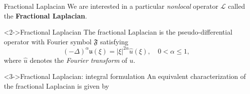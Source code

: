 \documentclass[aspectratio=169,xcolor=dvipsnames]{beamer}
\begin{document}
	\begin{frame}{Fractional Laplacian}
	We are interested in a particular \emph{nonlocal} operator $\mathcal{L}$ called the \alert{\textbf{Fractional Laplacian}}.
	
	\begin{block}<2->{Fractional Laplacian}
	The fractional Laplacian is the pseudo-differential operator with Fourier symbol $\mathfrak{F}$ satisfying
	\[
	\mathfrak{(-\Delta)^\alpha u}(\xi) = \lvert \xi \rvert^{2\alpha} \hat{u}(\xi), \quad 0 < \alpha \leq 1,
	\]
	where $\hat{u}$ denotes the \emph{Fourier transform} of $u$.
	\end{block}

	\begin{block}<3->{Fractional Laplacian: integral formulation}
	An equivalent characterization of the fractional Laplacian is given by
	\only<4->{
	\[
	- \mathcal{L} = (-\Delta)^\alpha, \quad 0 < \alpha < 1, \qquad \gamma(\mathbf{x},\mathbf{y}) = \frac{c_{n,\alpha}}{2\lvert\mathbf{y} - \mathbf{x}\rvert^{n+2\alpha}} \; \forall\,\mathbf{x},\mathbf{y} \in \mathbb{R}^n.
	\]
	}
	\end{block}
	
	
	\end{frame}
\end{document}

